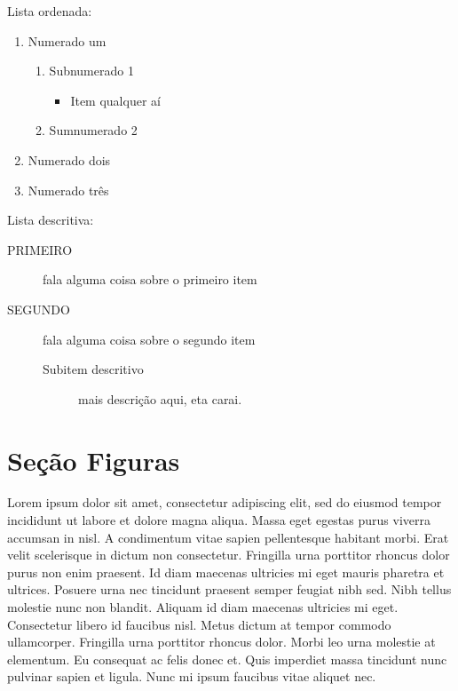 \documentclass[12pt]{article}
\begin{document}
		Lista ordenada:
		\begin{enumerate}
			\item Numerado um
				\begin{enumerate}
					\item Subnumerado 1
						\begin{itemize}
							\item Item qualquer aí
						\end{itemize}
					\item Sumnumerado 2
				\end{enumerate}
			\item Numerado dois
			\item Numerado três
		\end{enumerate}
	
		Lista descritiva:
		\begin{description}
			\item[PRIMEIRO] fala alguma coisa sobre o primeiro item
			\item[SEGUNDO] fala alguma coisa sobre o segundo item
				\begin{description}
					\item[Subitem descritivo] mais descrição aqui, eta carai.
				\end{description}
		\end{description}
	\newpage
	
	\section{Seção Figuras}
		Lorem ipsum dolor sit amet, consectetur adipiscing elit, sed do eiusmod tempor incididunt ut labore et dolore magna aliqua. Massa eget egestas purus viverra accumsan in nisl. A condimentum vitae sapien pellentesque habitant morbi. Erat velit scelerisque in dictum non consectetur. Fringilla urna porttitor rhoncus dolor purus non enim praesent. Id diam maecenas ultricies mi eget mauris pharetra et ultrices. Posuere urna nec tincidunt praesent semper feugiat nibh sed. Nibh tellus molestie nunc non blandit. Aliquam id diam maecenas ultricies mi eget. Consectetur libero id faucibus nisl. Metus dictum at tempor commodo ullamcorper. Fringilla urna porttitor rhoncus dolor. Morbi leo urna molestie at elementum. Eu consequat ac felis donec et. Quis imperdiet massa tincidunt nunc pulvinar sapien et ligula. Nunc mi ipsum faucibus vitae aliquet nec.
		
\end{document}
